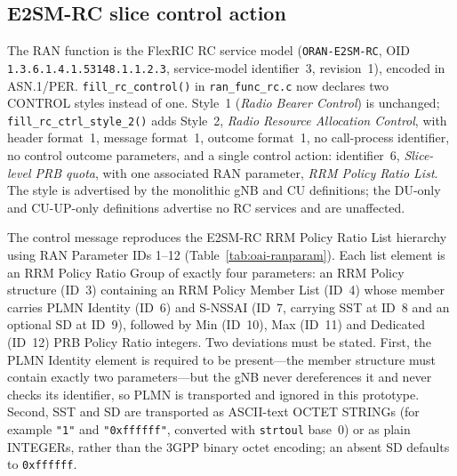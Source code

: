 \subsection{E2SM-RC slice control action}
The RAN function is the FlexRIC RC service model (\texttt{ORAN-E2SM-RC}, OID \texttt{1.3.6.1.4.1.53148.1.1.2.3}, service-model identifier~3, revision~1), encoded in ASN.1/PER. \texttt{fill\_rc\_control()} in \texttt{ran\_func\_rc.c} now declares two CONTROL styles instead of one. Style~1 (\emph{Radio Bearer Control}) is unchanged; \texttt{fill\_rc\_ctrl\_style\_2()} adds Style~2, \emph{Radio Resource Allocation Control}, with header format~1, message format~1, outcome format~1, no call-process identifier, no control outcome parameters, and a single control action: identifier~6, \emph{Slice-level PRB quota}, with one associated RAN parameter, \emph{RRM Policy Ratio List}. The style is advertised by the monolithic gNB and CU definitions; the DU-only and CU-UP-only definitions advertise no RC services and are unaffected.

The control message reproduces the E2SM-RC RRM Policy Ratio List hierarchy using RAN Parameter IDs 1--12 (Table~\ref{tab:oai-ranparam}). Each list element is an RRM Policy Ratio Group of exactly four parameters: an RRM Policy structure (ID~3) containing an RRM Policy Member List (ID~4) whose member carries PLMN Identity (ID~6) and S-NSSAI (ID~7, carrying SST at ID~8 and an optional SD at ID~9), followed by Min (ID~10), Max (ID~11) and Dedicated (ID~12) PRB Policy Ratio integers. Two deviations must be stated. First, the PLMN Identity element is required to be present---the member structure must contain exactly two parameters---but the gNB never dereferences it and never checks its identifier, so PLMN is transported and ignored in this prototype. Second, SST and SD are transported as ASCII-text OCTET STRINGs (for example \texttt{"1"} and \texttt{"0xffffff"}, converted with \texttt{strtoul} base~0) or as plain INTEGERs, rather than the 3GPP binary octet encoding; an absent SD defaults to \texttt{0xffffff}.

